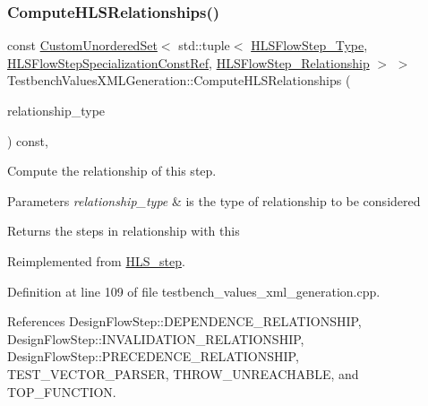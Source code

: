 \subsubsection{\texorpdfstring{Compute\+H\+L\+S\+Relationships()}{ComputeHLSRelationships()}}
{\footnotesize\ttfamily const \hyperlink{classCustomUnorderedSet}{Custom\+Unordered\+Set}$<$ std\+::tuple$<$ \hyperlink{hls__step_8hpp_ada16bc22905016180e26fc7e39537f8d}{H\+L\+S\+Flow\+Step\+\_\+\+Type}, \hyperlink{hls__step_8hpp_a5fdd2edf290c196531d21d68e13f0e74}{H\+L\+S\+Flow\+Step\+Specialization\+Const\+Ref}, \hyperlink{hls__step_8hpp_a3ad360b9b11e6bf0683d5562a0ceb169}{H\+L\+S\+Flow\+Step\+\_\+\+Relationship} $>$ $>$ Testbench\+Values\+X\+M\+L\+Generation\+::\+Compute\+H\+L\+S\+Relationships (\begin{DoxyParamCaption}\item[{const \hyperlink{classDesignFlowStep_a723a3baf19ff2ceb77bc13e099d0b1b7}{Design\+Flow\+Step\+::\+Relationship\+Type}}]{relationship\+\_\+type }\end{DoxyParamCaption}) const\hspace{0.3cm}{\ttfamily [protected]}, {\ttfamily [virtual]}}



Compute the relationship of this step. 


\begin{DoxyParams}{Parameters}
{\em relationship\+\_\+type} & is the type of relationship to be considered \\
\hline
\end{DoxyParams}
\begin{DoxyReturn}{Returns}
the steps in relationship with this 
\end{DoxyReturn}


Reimplemented from \hyperlink{classHLS__step_aed0ce8cca9a1ef18e705fc1032ad4de5}{H\+L\+S\+\_\+step}.



Definition at line 109 of file testbench\+\_\+values\+\_\+xml\+\_\+generation.\+cpp.



References Design\+Flow\+Step\+::\+D\+E\+P\+E\+N\+D\+E\+N\+C\+E\+\_\+\+R\+E\+L\+A\+T\+I\+O\+N\+S\+H\+IP, Design\+Flow\+Step\+::\+I\+N\+V\+A\+L\+I\+D\+A\+T\+I\+O\+N\+\_\+\+R\+E\+L\+A\+T\+I\+O\+N\+S\+H\+IP, Design\+Flow\+Step\+::\+P\+R\+E\+C\+E\+D\+E\+N\+C\+E\+\_\+\+R\+E\+L\+A\+T\+I\+O\+N\+S\+H\+IP, T\+E\+S\+T\+\_\+\+V\+E\+C\+T\+O\+R\+\_\+\+P\+A\+R\+S\+ER, T\+H\+R\+O\+W\+\_\+\+U\+N\+R\+E\+A\+C\+H\+A\+B\+LE, and T\+O\+P\+\_\+\+F\+U\+N\+C\+T\+I\+ON.

